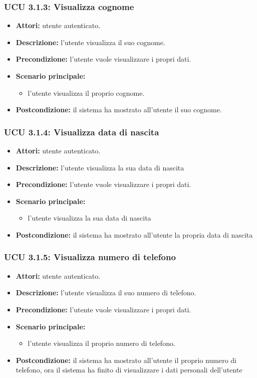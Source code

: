 \subsubsection{UCU 3.1.3: Visualizza cognome}
\begin{itemize}
	\item \textbf{Attori: } utente autenticato.
	\item \textbf{Descrizione: } l'utente visualizza il suo cognome.
	\item \textbf{Precondizione: } l'utente vuole visualizzare i propri dati.
	\item \textbf{Scenario principale:}
	\begin{itemize}
		\item l'utente visualizza il proprio cognome.
	\end{itemize}
	\item \textbf{Postcondizione:} il sistema ha mostrato all'utente il suo cognome.
\end{itemize}

\subsubsection{UCU 3.1.4: Visualizza data di nascita}
\begin{itemize}
	\item \textbf{Attori: } utente autenticato.
	\item \textbf{Descrizione: } l'utente visualizza la sua data di nascita
	\item \textbf{Precondizione: } l'utente vuole visualizzare i propri dati.
	\item \textbf{Scenario principale:}
	\begin{itemize}
		\item l'utente visualizza la sua data di nascita
	\end{itemize}
	\item \textbf{Postcondizione:} il sistema ha mostrato all'utente la propria data di nascita
\end{itemize}

\subsubsection{UCU 3.1.5: Visualizza numero di telefono}
\begin{itemize}
	\item \textbf{Attori: } utente autenticato.
	\item \textbf{Descrizione: } l'utente visualizza il suo numero di telefono.
	\item \textbf{Precondizione: } l'utente vuole visualizzare i propri dati.
	\item \textbf{Scenario principale:}
	\begin{itemize}
	 \item l'utente visualizza il proprio numero di telefono.
	\end{itemize}
	\item \textbf{Postcondizione:} il sistema ha mostrato all'utente il proprio numero di telefono, ora il sistema ha finito di visualizzare i dati personali dell'utente
\end{itemize}

